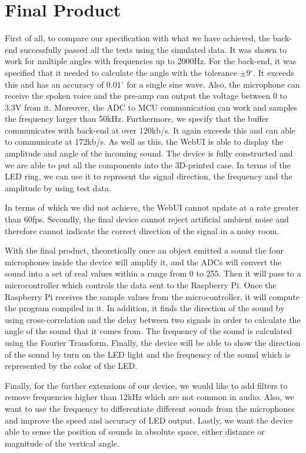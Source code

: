 \documentclass[a4paper]{article}
\begin{document}
\section{Final Product}

First of all, to compare our specification with what we have achieved, the back-end
successfully passed all the tests using the simulated data. It was shown to work
for multiple angles with frequencies up to 2000Hz. For the back-end, it was specified that
it needed to calculate the angle with the tolerance \(\pm 9{^\circ}\). It exceeds this and has an accuracy of \(0.01{^\circ}\) for a single sine wave. Also, the
microphone can receive the spoken voice and the pre-amp can output the voltage
between 0 to 3.3V from it. Moreover, the ADC to MCU communication
can work and samples the frequency larger than 50kHz. Furthermore, we specify
that the buffer communicates with back-end at over 120kb/s.  It again exceeds this and can
able to communicate at 172kb/s. As well as this, the WebUI is able to display
the amplitude and angle of the incoming sound.  The device is fully
constructed and we are able to put all the components into the 3D-printed case. In terms of the LED ring, we can use it to represent the
signal direction, the frequency and the amplitude by using test data.

In terms of which we did not achieve, the WebUI cannot update at a rate
greater than 60fps. Secondly, the final device cannot reject artificial ambient noise
and therefore cannot indicate the correct direction of the signal in a noisy
room.

With the final product, theoretically once an object emitted a sound the
four microphones inside the device will amplify it, and
the ADCs will convert the sound into
a set of real values within a range from 0 to 255. Then it will pass to a
microcontroller which controls the data sent to the Raspberry Pi. Once
the Raspberry Pi receives the sample values from the
microcontroller, it will compute the program compiled in it. In addition, it
finds the direction of the sound by using cross-correlation and the delay
between two signals in order to calculate the angle of the sound that it comes
from. The frequency of the sound is calculated using the Fourier
Transform. Finally, the device will be able to show the direction of the sound
by turn on the LED light and the frequency of the sound which is represented by
the color of the LED.

Finally, for the further extensions of our device, we would like to add filters
to remove frequencies higher than 12kHz which are not common in audio. Also, we want to use the
frequency to differentiate different sounds from the microphones and improve
the speed and accuracy of LED output.  Lastly, we want the device able to
sense the position of sounds in absolute space, either distance or magnitude of
the vertical angle.
\end{document}
